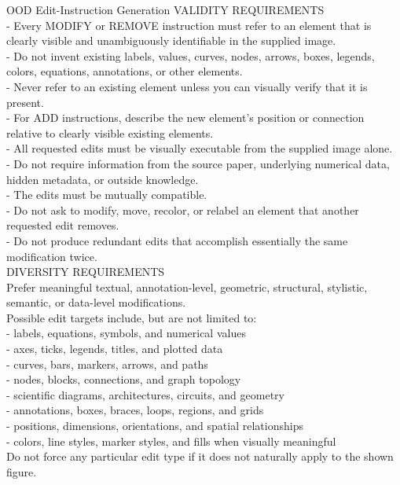\begin{PromptBox}{OOD Edit-Instruction Generation}
VALIDITY REQUIREMENTS \\
- Every MODIFY or REMOVE instruction must refer to an element that is clearly visible and unambiguously identifiable in the supplied image. \\
- Do not invent existing labels, values, curves, nodes, arrows, boxes, legends, colors, equations, annotations, or other elements. \\
- Never refer to an existing element unless you can visually verify that it is present. \\
- For ADD instructions, describe the new element's position or connection relative to clearly visible existing elements. \\
- All requested edits must be visually executable from the supplied image alone. \\
- Do not require information from the source paper, underlying numerical data, hidden metadata, or outside knowledge. \\
- The edits must be mutually compatible. \\
- Do not ask to modify, move, recolor, or relabel an element that another requested edit removes. \\
- Do not produce redundant edits that accomplish essentially the same modification twice. \\

DIVERSITY REQUIREMENTS \\
Prefer meaningful textual, annotation-level, geometric, structural, stylistic, semantic, or data-level modifications. \\

Possible edit targets include, but are not limited to: \\
- labels, equations, symbols, and numerical values \\
- axes, ticks, legends, titles, and plotted data \\
- curves, bars, markers, arrows, and paths \\
- nodes, blocks, connections, and graph topology \\
- scientific diagrams, architectures, circuits, and geometry \\
- annotations, boxes, braces, loops, regions, and grids \\
- positions, dimensions, orientations, and spatial relationships \\
- colors, line styles, marker styles, and fills when visually meaningful \\

Do not force any particular edit type if it does not naturally apply to the shown figure. \\


\end{PromptBox}

